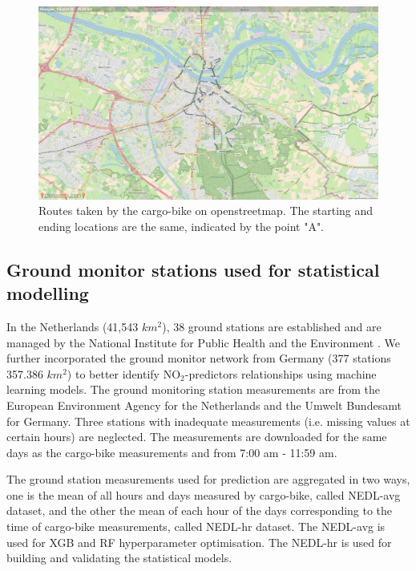 \documentclass{article}
\begin{document}
\begin{figure}
    \includegraphics[width=\linewidth,trim=4cm 1cm 4cm 1cm, clip=true]{f1b.jpg}
    
    \caption {Routes taken by the cargo-bike on openstreetmap\citep{openstreetmap}. The starting and ending locations are the same, indicated by the point "A". }
    \label{route}
\end{figure}

\subsection{Ground monitor stations used for statistical modelling}

In the Netherlands (41,543 $km^2$), 38 ground stations are established and are managed by the National Institute for Public Health and the Environment \citep[RIVM,][]{RIVMLML}. We further incorporated the ground monitor network from Germany (377 stations 357.386 $km^2$) to better identify NO$_2$-predictors relationships using machine learning models. The ground monitoring station measurements 
are from the European Environment Agency \citep{EEA} for the Netherlands and the Umwelt Bundesamt \citep{germansource} for Germany. Three stations with inadequate measurements (i.e. missing values at certain hours) are neglected. The measurements are downloaded for the same days as the cargo-bike measurements and from 7:00 am - 11:59 am.  

The ground station measurements used for prediction are aggregated in two ways, one is the mean of all hours and days measured by cargo-bike, called NEDL-avg dataset, and the other the mean of each hour of the days corresponding to the time of cargo-bike measurements, called NEDL-hr dataset. The NEDL-avg is used for XGB and RF hyperparameter optimisation. The NEDL-hr is used for building and validating the statistical models.
\end{document}
